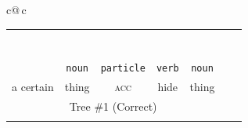 \documentclass[a4paper,landscape,headrule,footrule,dvips]{foils}
\newcommand{\sa}[2]{\rnode{c#1}{\iz{#2}}}%
\begin{document}
\begin{CJK}{UTF8}{min}
{\begin{tabular}{c@{\,}c}
  \addtolength{\tabcolsep}{-0.3em}
  \begin{tabular}{ccccccc}
   &\multicolumn{5}{c}{\sa{1}{NP-frag}}  \\[1ex]
   &\multicolumn{5}{c}{\sa{2}{\wl{rel-cl-sbj-gap}}}  \\[1ex]
   &\multicolumn{3}{c}{\sa{3}{hd-complement}} & \sa{4}{N} \\[1ex]
   \multicolumn{3}{c}{\sa{5}{hd-complement}} & \multicolumn{1}{c}{\sa{J}{V}} &
   \\[1ex]
   \multicolumn{2}{c}{\sa{I}{\ul{hd-specifier}}} & & &  & \\[1ex]
   \sa{H}{DET} & \sa{7}{N}      & \sa{8}{CASE-P} &   &  \\[1ex]
   \sa{G}{ある} & \sa{B}{物事} & \sa{C}{を} & \sa{D}{隠す} &  \sa{F}{ 物} \\
   \texttt{\emp{\ul{adnominal}}} & \texttt{noun} & \texttt{particle} & \texttt{verb} & \texttt{noun} \\
   a certain & thing &  \textsc{acc} & hide &  thing \\
   \multicolumn{5}{c}{Tree \#1 (Correct)} \\ \\
  \end{tabular}
  \centering
   
   
   
    
   
   
  

\end{tabular}}
\end{CJK}
\end{document}
